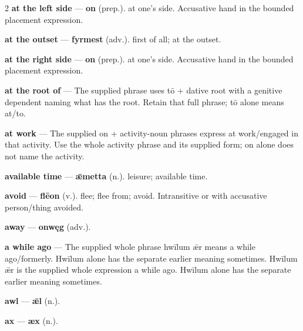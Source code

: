 \begin{multicols}{2}
\textbf{at the left side} — \textbf{on} (prep.). at one's side. Accusative hand in the bounded placement expression.\par
\textbf{at the outset} — \textbf{fyrmest} (adv.). first of all; at the outset.\par
\textbf{at the right side} — \textbf{on} (prep.). at one's side. Accusative hand in the bounded placement expression.\par
\textbf{at the root of} — The supplied phrase uses tō + dative root with a genitive dependent naming what has the root. Retain that full phrase; tō alone means at/to.\par
\textbf{at work} — The supplied on + activity-noun phrases express at work/engaged in that activity. Use the whole activity phrase and its supplied form; on alone does not name the activity.\par
\textbf{available time} — \textbf{ǣmetta} (n.). leisure; available time.\par
\textbf{avoid} — \textbf{flēon} (v.). flee; flee from; avoid. Intransitive or with accusative person/thing avoided.\par
\textbf{away} — \textbf{onwęg} (adv.).\par
\textbf{a while ago} — The supplied whole phrase hwīlum ǣr means a while ago/formerly. Hwīlum alone has the separate earlier meaning sometimes. Hwīlum ǣr is the supplied whole expression a while ago. Hwīlum alone has the separate earlier meaning sometimes.\par
\textbf{awl} — \textbf{ǣl} (n.).\par
\textbf{ax} — \textbf{æx} (n.).\par

\end{multicols}
